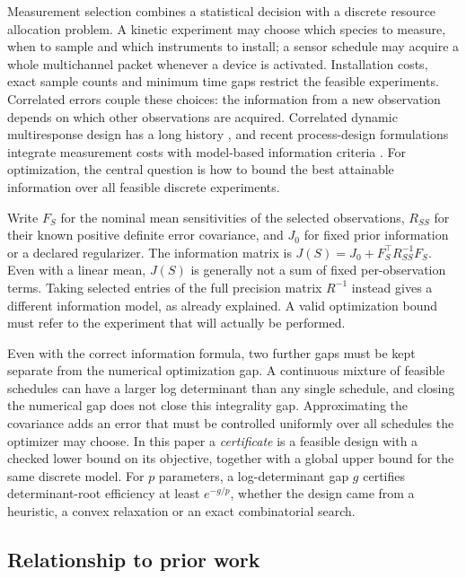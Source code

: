 Measurement selection combines a statistical decision with a discrete resource
allocation problem. A kinetic experiment may choose which species to measure,
when to sample and which instruments to install; a sensor schedule may acquire
a whole multichannel packet whenever a device is activated. Installation
costs, exact sample counts and minimum time gaps restrict the feasible
experiments. Correlated errors couple these choices: the information from a
new observation depends on which other observations are acquired.
Correlated dynamic multiresponse design has a long history \citep{Patan2007},
and recent process-design formulations integrate measurement costs with
model-based information criteria \citep{Wang2024}. For optimization, the
central question is how to bound the best attainable information over all
feasible discrete experiments.

Write $F_S$ for the nominal mean sensitivities of the selected observations,
$R_{SS}$ for their known positive definite error covariance, and $J_0$ for
fixed prior information or a declared regularizer. The information matrix is
$J(S)=J_0+F_S^\top R_{SS}^{-1}F_S$. Even with a linear mean, $J(S)$ is generally not a sum of fixed per-observation terms.
Taking selected entries of the full precision matrix $R^{-1}$ instead gives a
different information model, as \citet{Liu2016} already explained. A valid
optimization bound must refer to the experiment that will actually be
performed.

Even with the correct information formula, two further gaps must be kept
separate from the numerical optimization gap. A continuous mixture of
feasible schedules can have a larger log determinant than any single
schedule, and closing the numerical gap does not close this integrality gap.
Approximating the covariance adds an error that must be controlled uniformly
over all schedules the optimizer may choose. In this paper a
\emph{certificate} is a feasible design with a checked lower bound on its
objective, together with a global upper bound for the same discrete model.
For $p$ parameters, a log-determinant gap $g$ certifies determinant-root
efficiency at least $e^{-g/p}$, whether the design came from a heuristic, a
convex relaxation or an exact combinatorial search.

\subsection{Relationship to prior work}\label{subsec:intro-prior}

